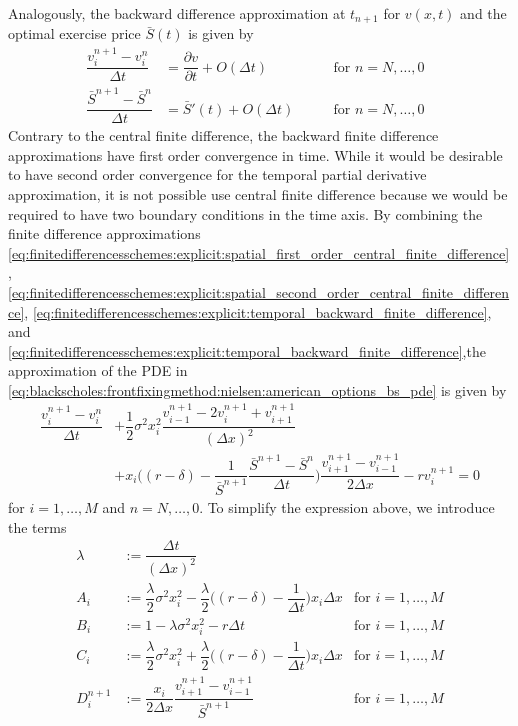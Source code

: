 Analogously, the backward difference approximation at $t_{n+1}$ for $v(x, t)$ and the optimal exercise price $\bar{S}(t)$ is given by
\begin{align}
  \label{eq:finitedifferencesschemes:explicit:temporal_backward_finite_difference}
  \dfrac{v^{n+1}_{i} - v^{n}_{i}}{\Delta{t}} &= \dfrac{\partial{v}}{\partial{t}}+ O(\Delta{t}) \qquad & \text{for $n = N,\dots,0$ } \\
  \label{eq:finitedifferencesschemes:explicit:front_temporal_backward_finite_difference}
  \dfrac{\bar{S}^{n+1}-\bar{S}^{n}}{\Delta t} &= \bar{S}'(t) + O(\Delta{t}) \qquad & \text{for $n = N,\dots,0$ }
\end{align}
Contrary to the central finite difference, the backward finite difference approximations have first order convergence in time. While it would be desirable to have second order convergence for the temporal partial derivative approximation, it is not possible use central finite difference because we would be required to have two boundary conditions in the time axis. By combining the finite difference approximations \eqref{eq:finitedifferencesschemes:explicit:spatial_first_order_central_finite_difference}, \eqref{eq:finitedifferencesschemes:explicit:spatial_second_order_central_finite_difference}, \eqref{eq:finitedifferencesschemes:explicit:temporal_backward_finite_difference}, and \eqref{eq:finitedifferencesschemes:explicit:temporal_backward_finite_difference},the approximation of the PDE in \eqref{eq:blackscholes:frontfixingmethod:nielsen:american_options_bs_pde} is given by 
\begin{equation*}
  \begin{split}
    \dfrac{v^{n+1}_{i} - v^{n}_{i}}{\Delta{t}} & + \dfrac{1}{2}\sigma^2 x_i^2 \dfrac{v^{n+1}_{i-1} - 2v^{n+1}_{i} + v^{n+1}_{i+1}}{(\Delta{x})^2} \\ 
     & + x_i\bigg( (r-\delta) - \dfrac{1}{\bar{S}^{n+1}}\dfrac{\bar{S}^{n+1} - \bar{S}^{n}}{\Delta{t}} \bigg)\dfrac{v^{n+1}_{i+1} - v^{n+1}_{i-1}}{2\Delta{x}} - rv^{n+1}_{i} = 0
  \end{split}
\end{equation*}
for $i = 1, \dots, M$ and $n = N, \dots, 0$. To simplify the expression above, we introduce the terms 
\begin{align*}
  \lambda &:= \dfrac{\Delta{t}}{(\Delta{x})^2} \\
  A_i &:= \dfrac{\lambda}{2}\sigma^2x^{2}_i - \dfrac{\lambda}{2}\bigg((r-\delta) - \dfrac{1}{\Delta{t}}\bigg)x_i\Delta{x} & \text{for $i = 1, \dots, M$} \\ 
  B_i &:= 1 - \lambda\sigma^2x_i^2 - r\Delta{t} & \text{for $i = 1, \dots, M$} \\
  C_i &:= \dfrac{\lambda}{2}\sigma^2x^{2}_i + \dfrac{\lambda}{2}\bigg((r-\delta) - \dfrac{1}{\Delta{t}}\bigg)x_i\Delta{x} &  \text{for $i = 1, \dots, M$} \\
  D^{n+1}_{i} &:= \dfrac{x_i}{2\Delta{x}}\dfrac{v^{n+1}_{i+1} - v^{n+1}_{i-1}}{\bar{S}^{n+1}} &  \text{for $i = 1, \dots, M$}
\end{align*}
